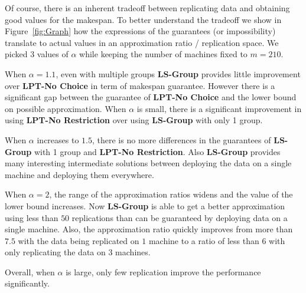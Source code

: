 \documentclass[10pt, conference, compsocconf]{IEEEtran}
\begin{document}
Of course, there is an inherent tradeoff between replicating data and
obtaining good values for the makespan. To better understand the
tradeoff we show in Figure~\ref{fig:Graph} how the expressions of the
guarantees (or impossibility) translate to actual values in an
approximation ratio / replication space.  We picked 3 values of
$\alpha$ while keeping the number of machines fixed to $m=210$. 

When $\alpha=1.1$, even with multiple groups {\bf LS-Group} provides little
improvement over {\bf LPT-No Choice} in term of makespan guarantee. However there is a significant
gap between the guarantee of {\bf LPT-No Choice} and the lower bound
on possible approximation. When $\alpha$ is small, there is a
significant improvement in using {\bf LPT-No Restriction} over using
 {\bf LS-Group} with only 1 group.

When $\alpha$ increases to $1.5$, there is no more differences in the
guarantees of {\bf LS-Group} with 1 group and {\bf LPT-No
  Restriction}. Also {\bf LS-Group} provides many interesting intermediate
solutions between deploying the data on a single machine and deploying
them everywhere.

When $\alpha=2$, the range of the approximation ratios widens and
the value of the lower bound increases. Now {\bf LS-Group} is able to
get a better approximation using less than $50$ replications than 
can be guaranteed by deploying data on a single machine. Also, the
approximation ratio quickly improves from more than $7.5$ with the
data being replicated on $1$ machine to a ratio of less than $6$ with
only replicating the data on $3$ machines.

Overall, when $\alpha$ is large, only few replication improve the
performance significantly.
\end{document}
